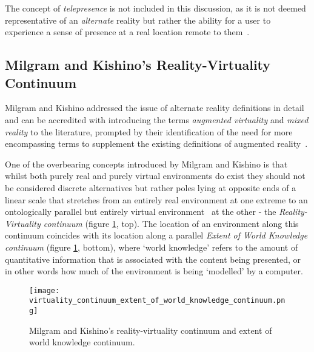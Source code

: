The concept of \textit{telepresence} is not included in this discussion, as it is not deemed representative of an \textit{alternate} reality but rather the ability for a user to experience a sense of presence at a real location remote to them~\cite{Sheridan1992a}.


\subsection{Milgram and Kishino's Reality-Virtuality Continuum}
\label{milgram&kishino}
Milgram and Kishino addressed the issue of alternate reality definitions in detail and can be accredited with introducing the terms \textit{augmented virtuality} and \textit{mixed reality} to the literature, prompted by their identification of the need for more encompassing terms to supplement the existing definitions of augmented reality~\cite{Milgram1994, Milgram1999}.


One of the overbearing concepts introduced by Milgram and Kishino is that whilst both purely real and purely virtual environments do exist they should not be considered discrete alternatives but rather poles lying at opposite ends of a linear scale that stretches from an entirely real environment at one extreme to an ontologically parallel but entirely virtual environment~\cite{Qvortrup2002} at the other - the \textit{Reality-Virtuality continuum} (figure \ref{reality_virtuality_extent_of_world_knowledge_continuum}, top). The location of an environment along this continuum coincides with its location along a parallel \textit{Extent of World Knowledge continuum} (figure \ref{reality_virtuality_extent_of_world_knowledge_continuum}, bottom), where `world knowledge' refers to the amount of quantitative information that is associated with the content being presented, or in other words how much of the environment is being `modelled' by a computer.

\begin{figure}[h]
\centering
\texttt{[image: virtuality\_continuum\_extent\_of\_world\_knowledge\_continuum.png]}
\caption{Milgram and Kishino's reality-virtuality continuum and extent of world knowledge continuum.}
\label{reality_virtuality_extent_of_world_knowledge_continuum}
\end{figure}


